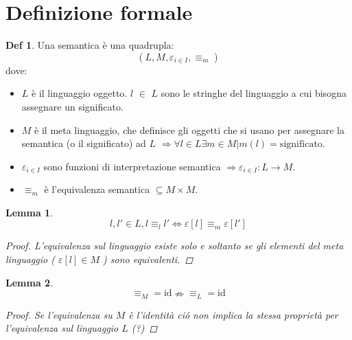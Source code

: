 \documentclass[a4paper]{report}
\theoremstyle{definition} \newtheorem*{defi}{Def}
\theoremstyle{plain} \newtheorem{lemma}{Lemma}
\theoremstyle{plain} \newtheorem{teo}{Teorema}
\theoremstyle{remark} \newtheorem*{es}{Esempio}
\begin{document}
\section{Definizione formale}
\begin{defi}
	Una semantica è una quadrupla:
	\begin{equation}
	\left(L,M, \varepsilon_{i\in I}, \equiv_m\right)
	\end{equation}
	dove:
	\begin{itemize}
		\item $L$ è il linguaggio oggetto. $l$ $\in$ $L$ sono le stringhe del linguaggio a cui bisogna assegnare un significato.
		\item $M$ è il meta linguaggio, che definisce gli oggetti che si usano per assegnare la semantica (o il significato) ad $L$ $\Rightarrow \forall l \in L \exists m \in M | m(l) = \mathrm{significato}$.
		\item $\varepsilon_{i\in I}$ sono funzioni di interpretazione semantica $\Rightarrow \varepsilon_{i\in I} : L \rightarrow M $.
		\item $\equiv_m$ è l'equivalenza semantica $\subseteq M \times M$.
	\end{itemize}
\end{defi}
\begin{lemma}
	\begin{equation}
		l,l' \in L, l \equiv_l l' \Longleftrightarrow \varepsilon[l] \equiv_m \varepsilon[l']
	\end{equation}
	\begin{proof}
		L'equivalenza sul linguaggio esiste solo e soltanto se gli elementi del meta linguaggio ( $\varepsilon[l] \in M$ ) sono equivalenti.
	\end{proof}
\end{lemma}
\begin{lemma}
	\begin{equation}
		\equiv_M = \mathrm{id} \nRightarrow \equiv_L = \mathrm{id}
	\end{equation}
	\begin{proof}
		Se l'equivalenza su $M$ è l'identità ci\'o non implica la stessa proprietà per l'equivalenza sul linguaggio $L$ (?)
	\end{proof}
\end{lemma}
\end{document}
